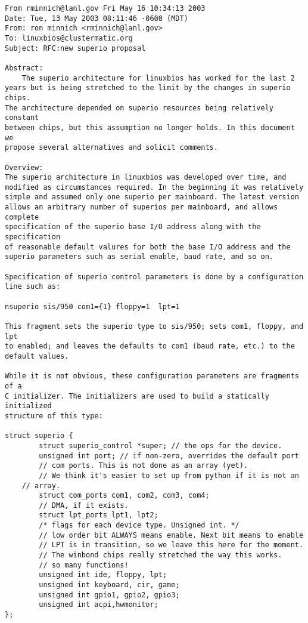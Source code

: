 \begin{verbatim}
From rminnich@lanl.gov Fri May 16 10:34:13 2003
Date: Tue, 13 May 2003 08:11:46 -0600 (MDT)
From: ron minnich <rminnich@lanl.gov>
To: linuxbios@clustermatic.org
Subject: RFC:new superio proposal

Abstract:
	The superio architecture for linuxbios has worked for the last 2 
years but is being stretched to the limit by the changes in superio chips. 
The architecture depended on superio resources being relatively constant 
between chips, but this assumption no longer holds. In this document we 
propose several alternatives and solicit comments. 

Overview:
The superio architecture in linuxbios was developed over time, and 
modified as circumstances required. In the beginning it was relatively 
simple and assumed only one superio per mainboard. The latest version 
allows an arbitrary number of superios per mainboard, and allows complete
specification of the superio base I/O address along with the specification
of reasonable default valures for both the base I/O address and the 
superio parameters such as serial enable, baud rate, and so on. 

Specification of superio control parameters is done by a configuration 
line such as:

nsuperio sis/950 com1={1} floppy=1  lpt=1

This fragment sets the superio type to sis/950; sets com1, floppy, and lpt 
to enabled; and leaves the defaults to com1 (baud rate, etc.) to the 
default values. 

While it is not obvious, these configuration parameters are fragments of a
C initializer. The initializers are used to build a statically initialized
structure of this type:

struct superio {
        struct superio_control *super; // the ops for the device.
        unsigned int port; // if non-zero, overrides the default port
        // com ports. This is not done as an array (yet).
        // We think it's easier to set up from python if it is not an 
	// array.
        struct com_ports com1, com2, com3, com4;
        // DMA, if it exists.
        struct lpt_ports lpt1, lpt2;
        /* flags for each device type. Unsigned int. */
        // low order bit ALWAYS means enable. Next bit means to enable
        // LPT is in transition, so we leave this here for the moment.
        // The winbond chips really stretched the way this works.
        // so many functions!
        unsigned int ide, floppy, lpt;
        unsigned int keyboard, cir, game;
        unsigned int gpio1, gpio2, gpio3;
        unsigned int acpi,hwmonitor;
};


\end{verbatim}
